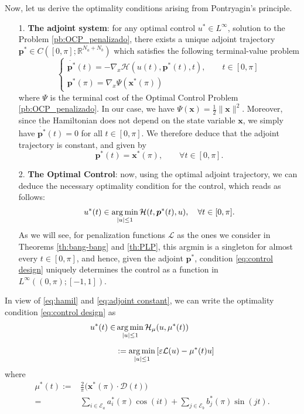 \documentclass[twocolumn]{autart}    %
\begin{document}
Now, let us derive the optimality conditions arising from Pontryagin's principle.
\begin{itemize}
	\item[1.] \textbf{The adjoint system}: for any optimal control $u^\ast \in L^\infty$, solution to the Problem \ref{pb:OCP_penalizado}, there exists a unique adjoint trajectory $\bm{p}^\ast\in C([0,\pi]; \mathbb{R}^{N_a+N_b})$ which satisfies the following terminal-value problem
    \begin{equation*}
    	\begin{cases}
    		\dot{\bm{p}^\ast}(t) = -\nabla_x \mathcal{H}(u(t),\bm{p}^\ast(t),t), \qquad t \in [0,\pi] 
    		\\[5pt]
    		\bm{p}^\ast (\pi) = \nabla_x \Psi (\bm{x}^\ast (\pi))
    	\end{cases}
    \end{equation*}
    where $\Psi$ is the terminal cost of the Optimal Control Problem \ref{pb:OCP_penalizado}. In our case, we have $\Psi (\bm{x}) = \frac{1}{2} \| \bm{x}\|^2$. Moreover, since the Hamiltonian does not depend on the state variable $\bm{x}$, we simply have $\dot{\bm{p}^\ast}(t) = 0$ for all $t \in [0,\pi]$. We therefore deduce that the adjoint trajectory is constant, and given by
    \begin{equation}\label{eq:adjoint constant}
		\bm{p}^\ast (t) = \bm{x}^\ast (\pi), \qquad \forall t \in [0,\pi]. 
	\end{equation}
    
    \item[2.] \textbf{The Optimal  Control}: now, using the optimal adjoint trajectory, we can deduce the necessary optimality condition for the control, which reads as follows:
    \begin{align}\label{eq:control design}
    	u^* (t) \in \operatorname*{arg\,min}_{|u|\leq 1} \mathcal{H}(t,\bm{p}^*(t),u), \quad \forall t \in [0,\pi].
    \end{align}
    As we will see, for penalization functions $\mathcal{L}$ as the ones we consider in Theorems \ref{th:bang-bang} and \ref{th:PLP}, this argmin is a singleton for almost every $t\in [0,\pi]$, and hence, given the adjoint $\bm{p}^\ast$,  condition \eqref{eq:control design} uniquely determines the control as a function in $L^\infty((0,\pi);[-1,1])$.
\end{itemize}
    
In view of \eqref{eq:hamil} and \eqref{eq:adjoint constant}, we can write the optimality condition \eqref{eq:control design} as
\begin{align}\label{eq:control design2}
    u^\ast(t)  \in & \operatorname*{arg\,min}_{|u|\leq 1}  \mathcal{H}_\mu (u,\mu^\ast(t))  
    \\[5pt]
    &:=\operatorname*{arg\,min}_{|u|\leq 1}   \left[\varepsilon \mathcal{L}(u) - \mu^\ast(t) u \right] \nonumber
\end{align}    
where 
\begin{align}\label{eq:m ast}
    \mu^\ast (t) := & \frac 2\pi \big(\bm{x}^*(\pi) \cdot \bm{\mathcal{D}}(t)\big) 
    \\[5pt]
    = & \sum_{i \in \mathcal{E}_a} a^*_i (\pi) \cos(it) + \sum_{j \in \mathcal{E}_b} b^*_j (\pi) \sin(jt). \nonumber
\end{align}
\end{document}
